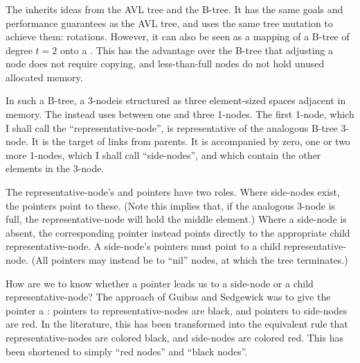 \subsubsection{\RBt}

The \RBt inherits ideas from the AVL tree and the B-tree.
It has the same goals and performance guarantees as the AVL tree,
  and uses the same tree mutation to achieve them: rotations.
However, it can also be seen as 
  a mapping of a B-tree of degree $t = 2$ onto a \BST.\footnotemark
This has the advantage over the B-tree that
  adjusting a node does not require copying,
  and less-than-full nodes do not hold unused allocated memory.


In such a B-tree,
  a 3-node\footnotemark is structured as three element-sized spaces adjacent in memory.
The \RBt instead uses between one and three 1-nodes.
The first 1-node, which I shall call the \enquote{representative-node},
  is representative of the analogous B-tree 3-node.
It is the target of links from parents.
It is accompanied by zero, one or two more 1-nodes, which I shall call \enquote{side-nodes},
  and which contain the other elements in the 3-node.


The representative-node's  and  pointers have two roles.
Where side-nodes exist,
  the pointers point to these.
(Note this implies that, if the analogous 3-node is full,
  the representative-node will hold the middle element.)
Where a side-node is absent,
  the corresponding pointer instead points directly to the appropriate child representative-node.\footnotemark
A side-node's pointers must point to a child representative-node.
(All pointers may instead be to \enquote{nil} nodes, at which the tree terminates.)


How are we to know whether a pointer leads us to a side-node or a child representative-node?
The approach of Guibas and Sedgewick was to give the pointer a :
  pointers to representative-nodes are black,
  and pointers to side-nodes are red.
In the literature, this has been transformed into the equivalent rule that
  representative-nodes are colored black,
  and side-nodes are colored red.
This has been shortened to simply \enquote{red nodes} and \enquote{black nodes}.

